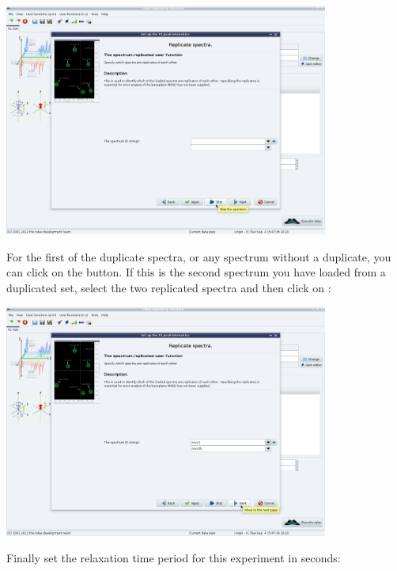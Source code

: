 \begin{minipage}[h]{\linewidth}
\centerline{\includegraphics[width=0.8\textwidth, bb=14 14 1415 1019]{graphics/screenshots/r1_analysis/peak_intensity_replicates1}}
\end{minipage}

For the first of the duplicate spectra, or any spectrum without a duplicate, you can click on the  button.  If this is the second spectrum you have loaded from a duplicated set, select the two replicated spectra and then click on :

\begin{minipage}[h]{\linewidth}
\centerline{\includegraphics[width=0.8\textwidth, bb=14 14 1415 1019]{graphics/screenshots/r1_analysis/peak_intensity_replicates2}}
\end{minipage}

Finally set the relaxation time period for this experiment in seconds:

